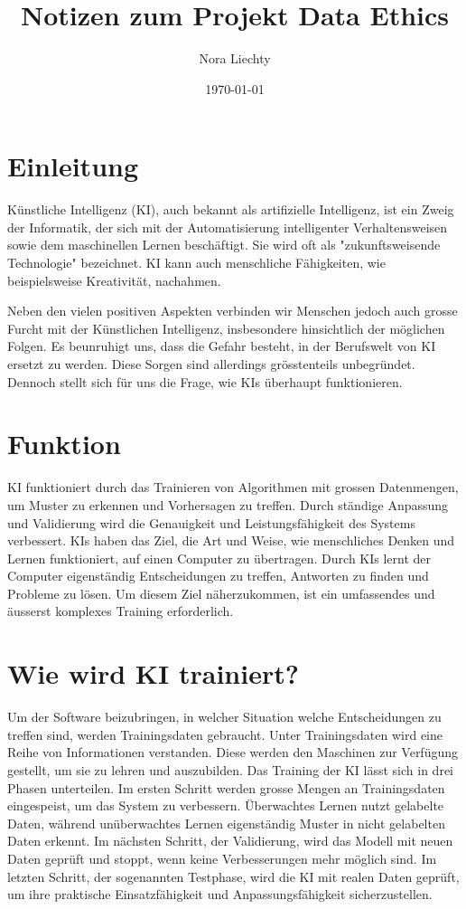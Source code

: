 \documentclass{article}
\title{Notizen zum Projekt Data Ethics}
\author{Nora Liechty}
\date{\today}
\begin{document}
\maketitle


\tableofcontents

\section{Einleitung}

Künstliche Intelligenz (KI), auch bekannt als artifizielle Intelligenz, ist ein Zweig der Informatik, der sich mit der Automatisierung intelligenter Verhaltensweisen sowie dem maschinellen Lernen beschäftigt. Sie wird oft als "zukunftsweisende Technologie" bezeichnet. KI kann auch menschliche Fähigkeiten, wie beispielsweise Kreativität, nachahmen.

Neben den vielen positiven Aspekten verbinden wir Menschen jedoch auch grosse Furcht mit der Künstlichen Intelligenz, insbesondere hinsichtlich der möglichen Folgen. Es beunruhigt uns, dass die Gefahr besteht, in der Berufswelt von KI ersetzt zu werden. Diese Sorgen sind allerdings grösstenteils unbegründet.
Dennoch stellt sich für uns die Frage, wie KIs überhaupt funktionieren. 
 
\section{Funktion}

KI funktioniert durch das Trainieren von Algorithmen mit grossen Datenmengen, um Muster zu erkennen und Vorhersagen zu treffen. Durch ständige Anpassung und Validierung wird die Genauigkeit und Leistungsfähigkeit des Systems verbessert. KIs haben das Ziel, die Art und Weise, wie menschliches Denken und Lernen funktioniert, auf einen Computer zu übertragen. Durch KIs lernt der Computer eigenständig Entscheidungen zu treffen, Antworten zu finden und Probleme zu lösen. Um diesem Ziel näherzukommen, ist ein umfassendes und äusserst komplexes Training erforderlich.

\section{Wie wird KI trainiert?}

Um der Software beizubringen, in welcher Situation welche Entscheidungen zu treffen sind, werden Trainingsdaten gebraucht. Unter Trainingsdaten wird eine Reihe von Informationen verstanden. Diese werden den Maschinen zur Verfügung gestellt, um sie zu lehren und auszubilden. 
Das Training der KI lässt sich in drei Phasen unterteilen. Im ersten Schritt werden grosse Mengen an Trainingsdaten eingespeist, um das System zu verbessern. Überwachtes Lernen nutzt gelabelte Daten, während unüberwachtes Lernen eigenständig Muster in nicht gelabelten Daten erkennt.
Im nächsten Schritt, der Validierung, wird das Modell mit neuen Daten geprüft und stoppt, wenn keine Verbesserungen mehr möglich sind. Im letzten Schritt, der sogenannten Testphase, wird die KI mit realen Daten geprüft, um ihre praktische Einsatzfähigkeit und Anpassungsfähigkeit sicherzustellen.
\end{document}
